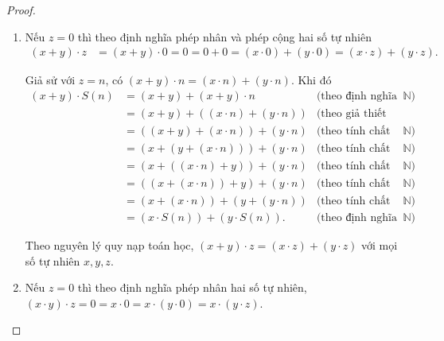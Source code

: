 \begin{proof}
    \begin{enumerate}[label={(\roman*)}]
        \item Nếu $z = 0$ thì theo định nghĩa phép nhân và phép cộng hai số tự nhiên
              \begin{align*}
                  (x + y)\cdot z & = (x + y)\cdot 0 = 0 = 0 + 0 = (x\cdot 0) + (y\cdot 0) = (x\cdot z) + (y\cdot z).
              \end{align*}

              Giả sử với $z = n$, có $(x + y)\cdot n = (x\cdot n) + (y\cdot n)$. Khi đó
              \begin{align*}
                  (x + y)\cdot S(n) & = (x + y) + (x + y)\cdot n            & \text{(theo định nghĩa phép nhân trên $\mathbb{N}$)}              \\
                                    & = (x + y) + ((x\cdot n) + (y\cdot n)) & \text{(theo giả thiết quy nạp)}                                   \\
                                    & = ((x + y) + (x\cdot n)) + (y\cdot n) & \text{(theo tính chất kết hợp của phép cộng trên $\mathbb{N}$)}   \\
                                    & = (x + (y + (x\cdot n))) + (y\cdot n) & \text{(theo tính chất kết hợp của phép cộng trên $\mathbb{N}$)}   \\
                                    & = (x + ((x\cdot n) + y)) + (y\cdot n) & \text{(theo tính chất giao hoán của phép cộng trên $\mathbb{N}$)} \\
                                    & = ((x + (x\cdot n)) + y) + (y\cdot n) & \text{(theo tính chất kết hợp của phép cộng trên $\mathbb{N}$)}   \\
                                    & = (x + (x\cdot n)) + (y + (y\cdot n)) & \text{(theo tính chất kết hợp của phép cộng trên $\mathbb{N}$)}   \\
                                    & = (x\cdot S(n)) + (y\cdot S(n)).      & \text{(theo định nghĩa của phép nhân trên $\mathbb{N}$)}
              \end{align*}

              Theo nguyên lý quy nạp toán học, $(x + y)\cdot z = (x\cdot z) + (y\cdot z)$ với mọi số tự nhiên $x, y, z$.
        \item Nếu $z = 0$ thì theo định nghĩa phép nhân hai số tự nhiên, $(x\cdot y)\cdot z = 0 = x\cdot 0 = x\cdot (y\cdot 0) = x\cdot (y\cdot z)$.


\end{enumerate}
\end{proof}
